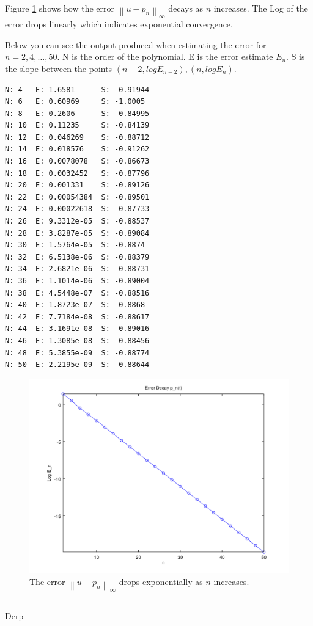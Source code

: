 \documentclass[12pt]{article}
\newcommand{\norm}[1]{\left\lVert#1\right\rVert}
\begin{document}
Figure \ref{fig_pt_log_err} shows how the error $\norm{u-p_n}_{\infty}$ decays as $n$ increases. The Log of the error drops linearly which indicates exponential convergence.

Below you can see the output produced when estimating the error for $n = 2, 4, \ldots, 50$.
N is the order of the polynomial. E is the error estimate $E_n$. S is the slope between 
the points $(n-2, log E_{n-2}), (n, log E_n)$.

\begin{minipage}{\linewidth}
\begin{lstlisting}
N: 4   E: 1.6581      S: -0.91944
N: 6   E: 0.60969     S: -1.0005
N: 8   E: 0.2606      S: -0.84995
N: 10  E: 0.11235     S: -0.84139
N: 12  E: 0.046269    S: -0.88712
N: 14  E: 0.018576    S: -0.91262
N: 16  E: 0.0078078   S: -0.86673
N: 18  E: 0.0032452   S: -0.87796
N: 20  E: 0.001331    S: -0.89126
N: 22  E: 0.00054384  S: -0.89501
N: 24  E: 0.00022618  S: -0.87733
N: 26  E: 9.3312e-05  S: -0.88537
N: 28  E: 3.8287e-05  S: -0.89084
N: 30  E: 1.5764e-05  S: -0.8874
N: 32  E: 6.5138e-06  S: -0.88379
N: 34  E: 2.6821e-06  S: -0.88731
N: 36  E: 1.1014e-06  S: -0.89004
N: 38  E: 4.5448e-07  S: -0.88516
N: 40  E: 1.8723e-07  S: -0.8868
N: 42  E: 7.7184e-08  S: -0.88617
N: 44  E: 3.1691e-08  S: -0.89016
N: 46  E: 1.3085e-08  S: -0.88456
N: 48  E: 5.3855e-09  S: -0.88774
N: 50  E: 2.2195e-09  S: -0.88644
\end{lstlisting}
\end{minipage}

\begin{figure}
    \includegraphics[width=.6\linewidth]{pt_log_err}
    \centering
    \caption{The error $\norm{u-p_n}_{\infty}$ drops exponentially as $n$ increases.}
    \label{fig_pt_log_err}
\end{figure}


\subsection{} %
Derp
\end{document}
